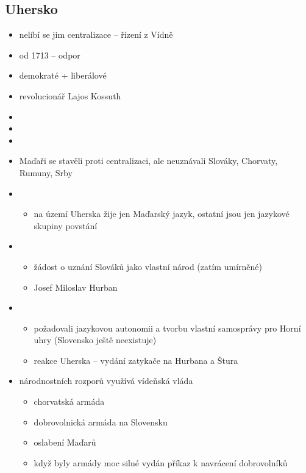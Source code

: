 \subsection{Uhersko}
\begin{itemize}
\item nelíbí se jim centralizace -- řízení z Vídně
\item od 1713 -- odpor
\item demokraté + liberálové
\item revolucionář Lajos Kossuth
\item {}
\item {}
\item {}
\item Maďaři se stavěli proti centralizaci, ale neuznávali Slováky, Chorvaty, Rumuny, Srby
\item {}
	\begin{itemize}
	\item na území Uherska žije jen Maďarský jazyk, ostatní jsou jen jazykové skupiny \ra povstání
	\end{itemize}
\item {}
	\begin{itemize}
	\item žádost o uznání Slováků jako vlastní národ (zatím umírněné)
	\item Josef Miloslav Hurban
	\end{itemize}
\item {}
	\begin{itemize}
	\item požadovali jazykovou autonomii a tvorbu vlastní samosprávy pro Horní uhry (Slovensko ještě neexistuje)
	\item reakce Uherska -- vydání zatykače na Hurbana a Štura
	\end{itemize}
\item národnostních rozporů využívá vídeňská vláda
	\begin{itemize}
	\item chorvatská armáda
	\item dobrovolnická armáda na Slovensku
	\item[\ra] oslabení Maďarů
	\item když byly armády moc silné \ra vydán příkaz k navrácení dobrovolníků
	\end{itemize}
\end{itemize}

